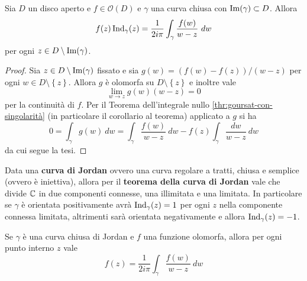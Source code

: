 \begin{theorem}
    Sia $D$ un disco aperto e $f \in \mathcal{O}(D)$ e $\gamma$ una curva
    chiusa con $\operatorname{Im}(\gamma) \subset D$. Allora
    \begin{equation*}
        f(z) \operatorname{Ind}_\gamma(z) = \frac{1}{2i\pi} \int_\gamma
        \frac{f(w)}{w-z} \ dw
    \end{equation*}
    per ogni $z \in D \setminus \operatorname{Im}(\gamma)$.
    \label{thr:formula-integrale-cauchy}
\end{theorem}
\begin{proof}
  Sia $z \in D \setminus \operatorname{Im}(\gamma)$ fissato e sia $g(w) = (f(w) - f(z))
  / (w-z)$ per ogni $w \in D \setminus \left\{ z \right\}$. 
  Allora $g$ è olomorfa su $D \setminus \left\{ z \right\}$ e inoltre vale
  \begin{equation*}
    \lim_{w \to z} g(w) (w-z) = 0
  \end{equation*}
  per la continuità di $f$. Per il Teorema dell'integrale nullo
  \ref{thr:goursat-con-singolarità} (in particolare il corollario 
  al teorema) applicato a $g$ si ha
  \begin{equation*}
    0  = \int_\gamma g(w)\ dw = \int_\gamma \frac{f(w)}{w-z}\ dw
    - f(z)\int_\gamma \frac{dw}{w-z}\ dw 
  \end{equation*}
  da cui segue la tesi.
\end{proof} 

\begin{remark}
  Data una \textbf{curva di Jordan} ovvero una curva regolare a tratti,
  chiusa e semplice (ovvero è iniettiva), allora per il \textbf{teorema
  della curva di Jordan} vale che divide $\mathbb{C}$ in due componenti connesse, 
  una illimitata e una limitata. In particolare se $\gamma$ è orientata 
  positivamente avrà $\operatorname{Ind}_\gamma(z) = 1$ per ogni $z$ nella
  componente connessa limitata, altrimenti sarà orientata negativamente
  e allora $\operatorname{Ind}_\gamma(z) = -1$.
    \label{rmk:teorema-curva-di-jordan}
\end{remark}

\begin{corollary}
    Se $\gamma$ è una curva chiusa di Jordan e $f$ una funzione olomorfa, allora
    per ogni punto interno $z$ vale 
    \begin{equation*}
        f(z) = \frac{1}{2i\pi} \int_\gamma\frac{f(w)}{w-z}\ dw
    \end{equation*}
    \label{cor:curva-jordan-integral-calculation}
\end{corollary}

